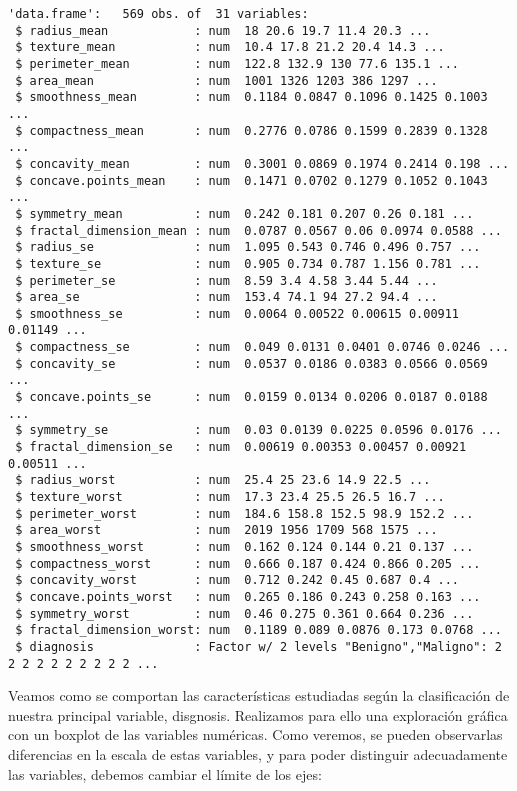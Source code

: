 \documentclass[
]{article}
\begin{document}
\begin{verbatim}
'data.frame':   569 obs. of  31 variables:
 $ radius_mean            : num  18 20.6 19.7 11.4 20.3 ...
 $ texture_mean           : num  10.4 17.8 21.2 20.4 14.3 ...
 $ perimeter_mean         : num  122.8 132.9 130 77.6 135.1 ...
 $ area_mean              : num  1001 1326 1203 386 1297 ...
 $ smoothness_mean        : num  0.1184 0.0847 0.1096 0.1425 0.1003 ...
 $ compactness_mean       : num  0.2776 0.0786 0.1599 0.2839 0.1328 ...
 $ concavity_mean         : num  0.3001 0.0869 0.1974 0.2414 0.198 ...
 $ concave.points_mean    : num  0.1471 0.0702 0.1279 0.1052 0.1043 ...
 $ symmetry_mean          : num  0.242 0.181 0.207 0.26 0.181 ...
 $ fractal_dimension_mean : num  0.0787 0.0567 0.06 0.0974 0.0588 ...
 $ radius_se              : num  1.095 0.543 0.746 0.496 0.757 ...
 $ texture_se             : num  0.905 0.734 0.787 1.156 0.781 ...
 $ perimeter_se           : num  8.59 3.4 4.58 3.44 5.44 ...
 $ area_se                : num  153.4 74.1 94 27.2 94.4 ...
 $ smoothness_se          : num  0.0064 0.00522 0.00615 0.00911 0.01149 ...
 $ compactness_se         : num  0.049 0.0131 0.0401 0.0746 0.0246 ...
 $ concavity_se           : num  0.0537 0.0186 0.0383 0.0566 0.0569 ...
 $ concave.points_se      : num  0.0159 0.0134 0.0206 0.0187 0.0188 ...
 $ symmetry_se            : num  0.03 0.0139 0.0225 0.0596 0.0176 ...
 $ fractal_dimension_se   : num  0.00619 0.00353 0.00457 0.00921 0.00511 ...
 $ radius_worst           : num  25.4 25 23.6 14.9 22.5 ...
 $ texture_worst          : num  17.3 23.4 25.5 26.5 16.7 ...
 $ perimeter_worst        : num  184.6 158.8 152.5 98.9 152.2 ...
 $ area_worst             : num  2019 1956 1709 568 1575 ...
 $ smoothness_worst       : num  0.162 0.124 0.144 0.21 0.137 ...
 $ compactness_worst      : num  0.666 0.187 0.424 0.866 0.205 ...
 $ concavity_worst        : num  0.712 0.242 0.45 0.687 0.4 ...
 $ concave.points_worst   : num  0.265 0.186 0.243 0.258 0.163 ...
 $ symmetry_worst         : num  0.46 0.275 0.361 0.664 0.236 ...
 $ fractal_dimension_worst: num  0.1189 0.089 0.0876 0.173 0.0768 ...
 $ diagnosis              : Factor w/ 2 levels "Benigno","Maligno": 2 2 2 2 2 2 2 2 2 2 ...
\end{verbatim}

Veamos como se comportan las características estudiadas según la
clasificación de nuestra principal variable, disgnosis. Realizamos para
ello una exploración gráfica con un boxplot de las variables numéricas.
Como veremos, se pueden observarlas diferencias en la escala de estas
variables, y para poder distinguir adecuadamente las variables, debemos
cambiar el límite de los ejes:
\end{document}
